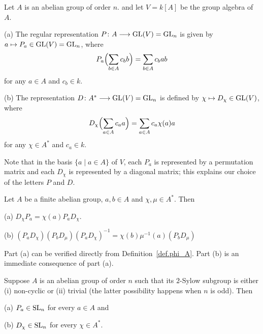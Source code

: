 \begin{defn} \label{def.phi_A} 
Let $A$ is an abelian group of order $n$. 
and let $V = k[A]$ be the group algebra of $A$.  

\smallskip
(a) The regular representation $P \colon A \longrightarrow \operatorname{GL}(V) = \operatorname{GL}_n$
is given by $a \mapsto P_a \in \operatorname{GL}(V) = \operatorname{GL}_n$,
where
\[ P_a\Bigl(\sum_{b \in A} c_b b\Bigr) = \sum_{b \in A} c_b ab  \]
for any $a \in A$ and $c_b \in k$. 
  
\smallskip
(b) The representation $D \colon A^{\ast} \longrightarrow \operatorname{GL}(V) = \operatorname{GL}_n$ is
defined by $\chi \mapsto D_{\chi} \in \operatorname{GL}(V)$, where
\[ D_{\chi}\Bigl( \sum_{a \in A} c_a a\Bigr) = \sum_{a \in A} c_a \chi(a) a  \]
for any $\chi \in A^{\ast}$ and $c_a \in k$. 

\smallskip
Note that in the basis $\{ a  \mid a \in A \}$ of $V$,
each $P_{a}$ is represented by a permutation matrix and each $D_{\chi}$ is
represented by a diagonal matrix; this explains our choice of the letters
$P$ and $D$.
\end{defn}

\begin{lem} \label{lem.formulas}
Let $A$ be a finite abelian group, $a, b \in A$ and
$\chi, \mu \in A^{\ast}$. Then

\smallskip
(a) $D_{\chi} P_a = \chi(a) P_a D_{\chi}$. 

\smallskip
(b) $(P_a D_{\chi}) (P_b D_{\mu}) (P_a D_{\chi})^{-1} = \chi(b) \mu^{-1}(a) 
(P_b D_{\mu})$
\end{lem}

\begin{pf} 
Part (a) can be verified directly from Definition~\ref{def.phi_A}.
Part (b) is an immediate consequence of part (a).
\end{pf}

\begin{lem} \label{lem.SL}
Suppose $A$ is an abelian group of order $n$ such that its $2$-Sylow
subgroup is either (i) non-cyclic or (ii) trivial (the latter possibility
happens when $n$ is odd).  Then

\smallskip
(a) $P_a \in \operatorname{SL}_n$ for every $a \in A$ and

\smallskip
(b) $D_\chi \in \operatorname{SL}_n$ for every $\chi \in A^{\ast}$.
\end{lem}

